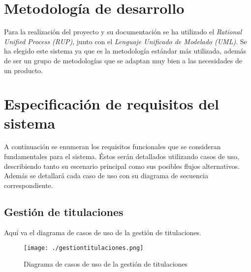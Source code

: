 
\section{Metodología de desarrollo}
Para la realización del proyecto y su documentación se ha utilizado el {\em Rational Unified Process (RUP)}, junto con el {\em Lenguaje Unificado de Modelado (UML)}. Se ha elegido este sistema ya que es la metodología estándar más utilizada, además de ser un grupo de metodologías que se adaptan muy bien a las necesidades de un producto.

\section{Especificación de requisitos del sistema}
A continuación se enumeran los requisitos funcionales que se consideran fundamentales para el sistema. Éstos serán detallados utilizando casos de uso, describiendo tanto su escenario principal como sus posibles flujos alternativos. Además se detallará cada caso de uso con su diagrama de secuencia correspondiente.


\subsection{Gestión de titulaciones}
 Aquí va el diagrama de casos de uso de la gestión de titulaciones.

\begin{figure}[H] 
  \label{gestion-titulaciones} 
	\begin{center}
    \texttt{[image: ./gestiontitulaciones.png]}
  \end{center}
\caption{Diagrama de casos de uso de la gestión de titulaciones}
\end{figure}
